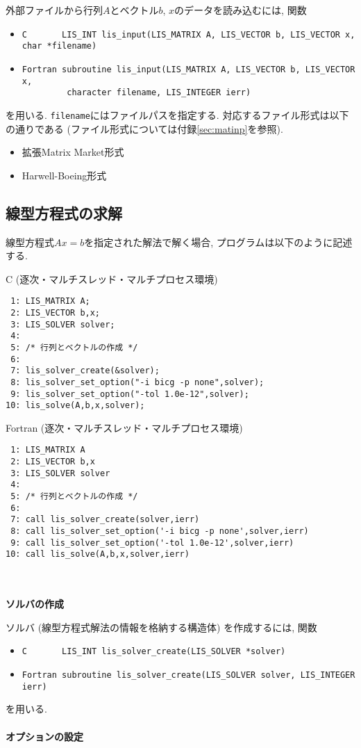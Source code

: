 \documentclass[a4paper]{jarticle}
\begin{document}
{{外部ファイルから行列$A$とベクトル$b$, $x$のデータを読み込むには, 関数
\begin{itemize}
\item \verb|C       LIS_INT lis_input(LIS_MATRIX A, LIS_VECTOR b, LIS_VECTOR x, char *filename)|
\item \verb|Fortran subroutine lis_input(LIS_MATRIX A, LIS_VECTOR b, LIS_VECTOR x,|\\
      \verb|         character filename, LIS_INTEGER ierr)|
\end{itemize}
を用いる. {\tt filename}にはファイルパスを指定する. 
対応するファイル形式は以下の通りである (ファイル形式については付録\ref{sec:matinp}を参照). 
\begin{itemize}
\item 拡張Matrix Market形式
\item Harwell-Boeing形式
\end{itemize}

\subsection{線型方程式の求解}\label{subsec:solve}
線型方程式$Ax=b$を指定された解法で解く場合, プログラムは以下のように記述する. 
\begin{itembox}[l]{C (逐次・マルチスレッド・マルチプロセス環境)}
\small
\begin{verbatim}
 1: LIS_MATRIX A; 
 2: LIS_VECTOR b,x; 
 3: LIS_SOLVER solver; 
 4:    
 5: /* 行列とベクトルの作成 */ 
 6:    
 7: lis_solver_create(&solver); 
 8: lis_solver_set_option("-i bicg -p none",solver); 
 9: lis_solver_set_option("-tol 1.0e-12",solver); 
10: lis_solve(A,b,x,solver); 
\end{verbatim}
\end{itembox}
\begin{itembox}[l]{Fortran (逐次・マルチスレッド・マルチプロセス環境)}
\small
\begin{verbatim}
 1: LIS_MATRIX A 
 2: LIS_VECTOR b,x 
 3: LIS_SOLVER solver 
 4:    
 5: /* 行列とベクトルの作成 */ 
 6:    
 7: call lis_solver_create(solver,ierr) 
 8: call lis_solver_set_option('-i bicg -p none',solver,ierr) 
 9: call lis_solver_set_option('-tol 1.0e-12',solver,ierr) 
10: call lis_solve(A,b,x,solver,ierr) 
\end{verbatim}
\end{itembox}
\\ \\
\noindent
{\bf ソルバの作成}

ソルバ (線型方程式解法の情報を格納する構造体) を作成するには, 関数
\begin{itemize}
\item \verb|C       LIS_INT lis_solver_create(LIS_SOLVER *solver)|
\item \verb|Fortran subroutine lis_solver_create(LIS_SOLVER solver, LIS_INTEGER ierr) |
\end{itemize}
を用いる. 
\\ \\
\noindent
{\bf オプションの設定}

}}
\end{document}
